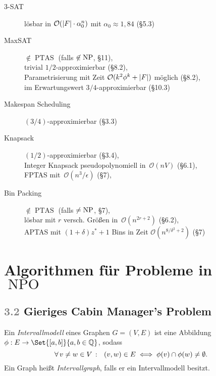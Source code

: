 \documentclass{cheat-sheet}
\DeclareMathOperator{\NPO}{NPO} %
\DeclareMathOperator{\NP}{NP} %
\let\P\relax %
\DeclareMathOperator{\P}{P} %
\DeclareMathOperator{\PTAS}{PTAS} %
\renewcommand{\O}{\mathcal{O}} %
\newcommand{\Problem}[1]{\textcolor{ProblemColor}{\textbf{#1}}}
\newcommand{\scriptSection}[1]{\textcolor{gray}{#1}\enspace}
\begin{document}
\begin{description}
  \item[3-SAT]
    lösbar in $\O(\abs{F} \cdot \alpha_0^n)$ mit $\alpha_0 \approx 1,84$ (§5.3)

  \item[MaxSAT]
    $\not\in \PTAS$ (falls $\P \not \in \NP$, §11), \\
    trivial $1/2$-approximierbar (§8.2), \\
    Parametrisierung mit Zeit $\O(k^2 \phi^k + \abs{F})$ möglich (§8.2), \\
    im Erwartungswert $3/4$-approximierbar (§10.3)

  \item[Makespan Scheduling]
    $(3/4)$-approximierbar (§3.3)

  \item[Knapsack]
    $(1/2)$-approximierbar (§3.4), \\
    Integer Knapsack pseudopolynomiell in~$\O(n V)$ (§6.1), \\
    FPTAS mit~$\O(n^3 / \epsilon)$ (§7),

  \item[Bin Packing]
    $\not\in \PTAS$ (falls $\P \neq \NP$, §7), \\
    lösbar mit $r$ versch. Größen in~$\O(n^{2r + 2})$ (§6.2), \\
    APTAS mit $(1+\delta) z^* + 1$ Bins in Zeit $\O(n^{8 / \delta^2 + 2})$ (§7)
\end{description}

\newpage

\section{Algorithmen für Probleme in~$\NPO$}


\subsection{\scriptSection{3.2} Gieriges \Problem{Cabin Manager's Problem}}

\begin{defn}
  Ein \emph{Intervallmodell} eines Graphen $G = (V, E)$ ist eine Abbildung $\phi : E \to \Set{\cinterval{a}{b}}{a, b \in \Q}$, sodass
  \[
    \forall \, {v \neq w \in V} \,:\, \enspace
    (v, w) \in E \iff \phi(v) \cap \phi(w) \neq \emptyset.
  \]
  Ein Graph heißt \emph{Intervallgraph}, falls er ein Intervallmodell besitzt.
\end{defn}
\end{document}
